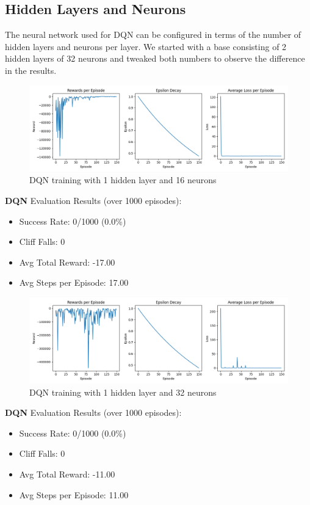 \documentclass[a4paper,12pt]{article}
\begin{document}
\subsection{Hidden Layers and Neurons}
The neural network used for DQN can be configured in terms of the number of hidden layers and neurons per layer.
We started with a base consisting of 2 hidden layers of 32 neurons and tweaked both numbers to observe the difference in the results.\\
\begin{figure}[H]
    \centering
    \includegraphics[width=\linewidth]{1_16.png}
    \caption{DQN training with 1 hidden layer and 16 neurons}
\end{figure}
\textbf{DQN} Evaluation Results (over 1000 episodes):
\begin{itemize}
    \item Success Rate: 0/1000 (0.0\%)
    \item Cliff Falls: 0
    \item Avg Total Reward: -17.00
    \item Avg Steps per Episode: 17.00
\end{itemize}
\begin{figure}[H]
    \centering
    \includegraphics[width=\linewidth]{1_32.png}
    \caption{DQN training with 1 hidden layer and 32 neurons}
\end{figure}
\textbf{DQN} Evaluation Results (over 1000 episodes):
\begin{itemize}
    \item Success Rate: 0/1000 (0.0\%)
    \item Cliff Falls: 0
    \item Avg Total Reward: -11.00
    \item Avg Steps per Episode: 11.00
\end{itemize}
\end{document}
